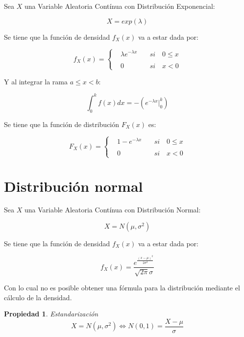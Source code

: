 \documentclass[a5paper,12pt,twoside]{book}
\newtheorem{prop}{{Propiedad}}[chapter]
\begin{document}
Sea $X$ una Variable Aleatoria Contínua con Distribución Exponencial:

\begin{equation}
X=exp(\lambda)
\end{equation}

Se tiene que la función de densidad $f_X(x)$ va a estar dada por:

\begin{equation}
f_X(x)= \left\{
\begin{array}{rcl}
&\lambda e^{-\lambda x}& \quad si \quad 0 \leq x
\\
\\
&0& \quad si \quad x < 0
\end{array}
\right.
\end{equation}

Y al integrar la rama $a \leq x < b$:

$$ \int_0^k f(x)dx = -\left( e^{-\lambda x} \Big|_0^k \right) $$

Se tiene que la función de distribución $F_X(x)$ es:

\begin{equation}
F_X(x)= \left\{
\begin{array}{rcl}
&1-e^{-\lambda x}& \quad si \quad 0 \leq x
\\
\\
&0& \quad si \quad x < 0
\end{array}
\right.
\end{equation}

\section{Distribución normal}

Sea $X$ una Variable Aleatoria Contínua con Distribución Normal:

\begin{equation}
X=N(\mu,\sigma^2)
\end{equation}

Se tiene que la función de densidad $f_X(x)$ va a estar dada por:

\begin{equation}
f_X(x)=\dfrac{e^{\tfrac{(x-\mu)^2}{2 \sigma^2}}}{\sqrt{2 \pi} \sigma}
\end{equation}

Con lo cual no es posible obtener una fórmula para la distribución mediante el cálculo de la densidad.

\begin{prop}
Estandarización
\begin{equation}
X=N(\mu,\sigma^2) \iff N(0,1)=\dfrac{X-\mu}{\sigma}
\end{equation}
\end{prop}
\end{document}
